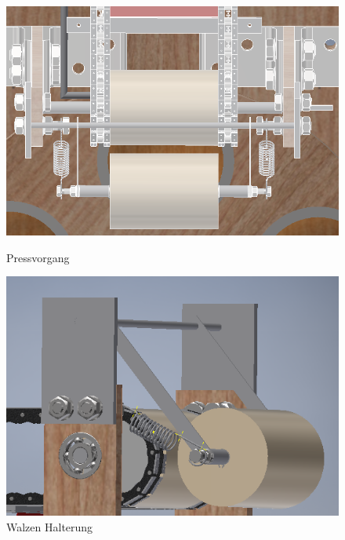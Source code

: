 \begin{figure}[H]
   \begin{minipage}[hbt]{.4\linewidth} %
      \includegraphics[width=\linewidth]{Bilder/Inventor/Walzen_Ansicht}
      \caption{Pressvorgang}
      \label{Pressvorgang_Inventor} 
   \end{minipage}
   \hspace{.2\linewidth}%
   \begin{minipage}[hbt]{.4\linewidth} %
      \includegraphics[width=\linewidth]{Bilder/Inventor/Aufhaengungs_Ansicht}
      \caption{Walzen Halterung}
      \label{Walzen_Halterung_Inventor}
   \end{minipage}
\end{figure}

